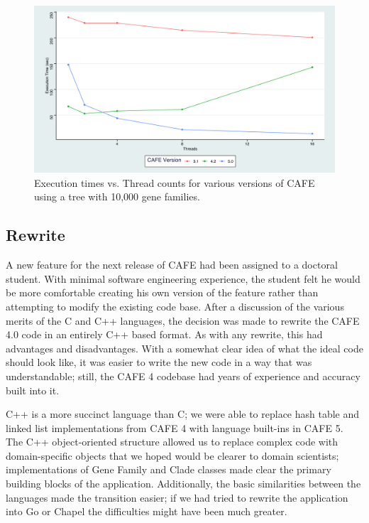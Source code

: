 \documentclass[acmtog, authorversion]{acmart}
\begin{document}
\begin{figure}[t] \label{fig:versionscale}
\includegraphics[scale = 0.075]{VersionsThreads}
\caption{Execution times vs. Thread counts for various versions of CAFE using a tree with 10,000 gene families.}
\end{figure}

\subsection{Rewrite}
A new feature for the next release of CAFE had been assigned to a doctoral student. With minimal software engineering experience, the student felt he would be more comfortable creating his own version of the feature rather than attempting to modify the existing code base. After a discussion of the various merits of the C and C++ languages, the decision was made to rewrite the CAFE 4.0 code in an entirely C++ based format. As with any rewrite, this had advantages and disadvantages. With a somewhat clear idea of what the ideal code should look like, it was easier to write the new code in a way that was understandable; still, the CAFE 4 codebase had years of experience and accuracy built into it. 
    
C++ is a more succinct language than C; we were able to replace hash table and linked list implementations from CAFE 4 with language built-ins in CAFE 5. The C++ object-oriented structure allowed us to replace complex code with domain-specific objects that we hoped would be clearer to domain scientists; implementations of Gene Family and Clade classes made clear the primary building blocks of the application. Additionally, the basic similarities between the languages made the transition easier; if we had tried to rewrite the application into Go or Chapel the difficulties might have been much greater.
    
\end{document}
